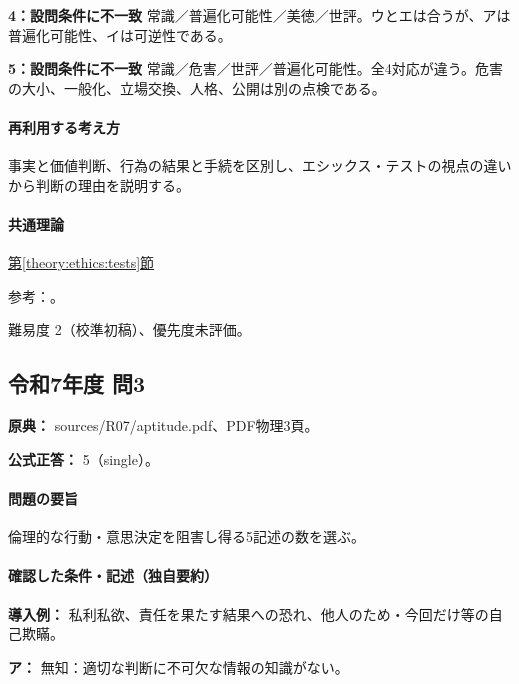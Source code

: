 \noindent\textbf{4：設問条件に不一致} 常識／普遍化可能性／美徳／世評。ウとエは合うが、アは普遍化可能性、イは可逆性である。\par

\noindent\textbf{5：設問条件に不一致} 常識／危害／世評／普遍化可能性。全4対応が違う。危害の大小、一般化、立場交換、人格、公開は別の点検である。\par

\paragraph{再利用する考え方} 事実と価値判断、行為の結果と手続を区別し、エシックス・テストの視点の違いから判断の理由を説明する。

\paragraph{共通理論} \hyperref[theory:ethics:tests]{第\ref*{theory:ethics:tests}節}

\par 参考：\cite{davis_seven_steps}。

\par 難易度 2（校準初稿）、優先度未評価。

\subsection{令和7年度 問3}
\label{q:r07-reg-apt-03}

\noindent\textbf{原典：} sources/R07/aptitude.pdf、PDF物理3頁。

\textbf{公式正答：} 5（single）。

\paragraph{問題の要旨} 倫理的な行動・意思決定を阻害し得る5記述の数を選ぶ。

\paragraph{確認した条件・記述（独自要約）}\mbox{}\par

\noindent\textbf{導入例：} 私利私欲、責任を果たす結果への恐れ、他人のため・今回だけ等の自己欺瞞。\par

\noindent\textbf{ア：} 無知：適切な判断に不可欠な情報の知識がない。\par

